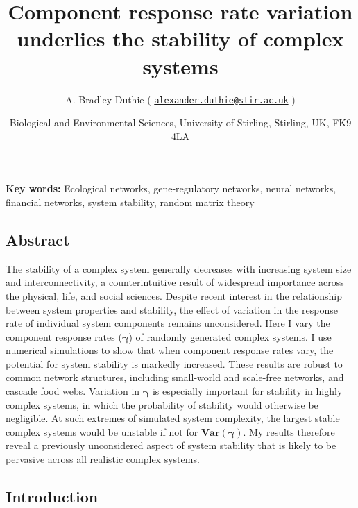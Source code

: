 \documentclass[]{article}
\title{Component response rate variation underlies the stability of complex
systems}
\author{A. Bradley Duthie (
\href{mailto:alexander.duthie@stir.ac.uk}{\nolinkurl{alexander.duthie@stir.ac.uk}}
)}
\date{Biological and Environmental Sciences, University of Stirling, Stirling,
UK, FK9 4LA}
\begin{document}
\maketitle

\textbf{Key words:} Ecological networks, gene-regulatory networks,
neural networks, financial networks, system stability, random matrix
theory

\subsection{Abstract}\label{abstract}

The stability of a complex system generally decreases with increasing
system size and interconnectivity, a counterintuitive result of
widespread importance across the physical, life, and social sciences.
Despite recent interest in the relationship between system properties
and stability, the effect of variation in the response rate of
individual system components remains unconsidered. Here I vary the
component response rates (\(\boldsymbol{\gamma}\)) of randomly generated
complex systems. I use numerical simulations to show that when component
response rates vary, the potential for system stability is markedly
increased. These results are robust to common network structures,
including small-world and scale-free networks, and cascade food webs.
Variation in \(\boldsymbol{\gamma}\) is especially important for
stability in highly complex systems, in which the probability of
stability would otherwise be negligible. At such extremes of simulated
system complexity, the largest stable complex systems would be unstable
if not for \(\boldsymbol{Var(\gamma)}\). My results therefore reveal a
previously unconsidered aspect of system stability that is likely to be
pervasive across all realistic complex systems.

\subsection{Introduction}\label{introduction}
\end{document}
